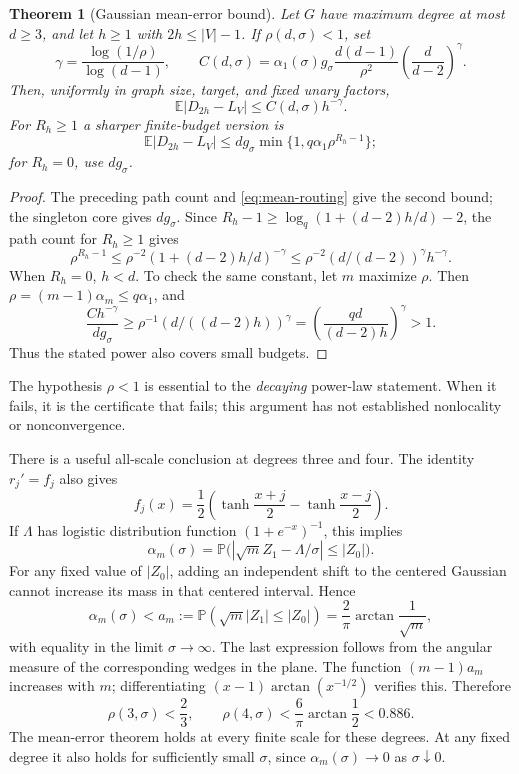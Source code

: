 \documentclass[11pt]{article}
\newtheorem{theorem}{Theorem}[section]
\theoremstyle{definition}
\theoremstyle{remark}
\newcommand{\E}{\mathbb E}
\newcommand{\Prob}{\mathbb P}
\newcommand{\err}{|D_{2h}-L_V|}
\begin{document}
\begin{theorem}[Gaussian mean-error bound]
\label{thm:upper}
Let $G$ have maximum degree at most $d\ge3$, and let $h\ge1$ with
$2h\le |V|-1$. If $\rho(d,\sigma)<1$, set
\[
 \gamma=\frac{\log(1/\rho)}{\log(d-1)},\qquad
 C(d,\sigma)=\alpha_1(\sigma)g_\sigma
       \frac{d(d-1)}{\rho^2}\left(\frac d{d-2}\right)^\gamma.
\]
Then, uniformly in graph size, target, and fixed unary factors,
\begin{equation}
 \boxed{\E\err\le C(d,\sigma)h^{-\gamma}.}
 \label{eq:upper}
\end{equation}
For $R_h\ge1$ a sharper finite-budget version is
\[
 \E\err\le d g_\sigma\min\{1,q\alpha_1\rho^{R_h-1}\};
\]
for $R_h=0$, use $d g_\sigma$.
\end{theorem}
\begin{proof}
The preceding path count and \eqref{eq:mean-routing} give the second bound;
the singleton core gives $d g_\sigma$. Since
$R_h-1\ge\log_q(1+(d-2)h/d)-2$, the path count for $R_h\ge1$ gives
\[
 \rho^{R_h-1}\le\rho^{-2}(1+(d-2)h/d)^{-\gamma}
                  \le\rho^{-2}(d/(d-2))^\gamma h^{-\gamma}.
\]
When $R_h=0$, $h<d$. To check the same constant, let $m$ maximize $\rho$.
Then $\rho=(m-1)\alpha_m\le q\alpha_1$, and
\[
 \frac{C h^{-\gamma}}{d g_\sigma}
 \ge\rho^{-1}(d/((d-2)h))^\gamma
 =\left(\frac{qd}{(d-2)h}\right)^\gamma>1.
\]
Thus the stated power also covers small budgets.
\end{proof}

The hypothesis $\rho<1$ is essential to the \emph{decaying} power-law
statement. When it fails, it is the certificate that fails; this argument
has not established nonlocality or nonconvergence.

There is a useful all-scale conclusion at degrees three and four. The
identity $r_j'=f_j$ also gives
\[
 f_j(x)=\frac12\left(\tanh\frac{x+j}{2}-\tanh\frac{x-j}{2}\right).
\]
If $\Lambda$ has logistic distribution function
$(1+e^{-x})^{-1}$, this implies
\[
 \alpha_m(\sigma)=
 \Prob\bigl(|\sqrt m Z_1-\Lambda/\sigma|\le |Z_0|\bigr).
\]
For any fixed value of $|Z_0|$, adding an independent shift to the centered
Gaussian cannot increase its mass in that centered interval. Hence
\begin{equation}
 \alpha_m(\sigma)<a_m:=\Prob(\sqrt m|Z_1|\le|Z_0|)
          =\frac2\pi\arctan\frac1{\sqrt m},
 \label{eq:allscale}
\end{equation}
with equality in the limit $\sigma\to\infty$. The last expression follows
from the angular measure of the corresponding wedges in the plane.
The function $(m-1)a_m$ increases with $m$; differentiating
$(x-1)\arctan(x^{-1/2})$ verifies this. Therefore
\[
 \rho(3,\sigma)<\frac23,\qquad
 \rho(4,\sigma)<\frac6\pi\arctan\frac12<0.886.
\]
The mean-error theorem holds at every finite scale for these degrees.
At any fixed degree it also holds for sufficiently small $\sigma$, since
$\alpha_m(\sigma)\to0$ as $\sigma\downarrow0$.
\end{document}
